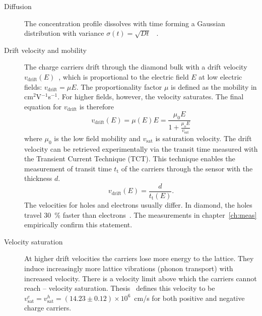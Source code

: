 \begin{description}

\item[Diffusion]
The concentration profile dissolves with time forming a Gaussian distribution with variance $\sigma(t)=\sqrt{Dt}$~\cite{} .

\item[Drift velocity and mobility]
The charge carriers drift through the diamond bulk with a drift velocity $v_\mathrm{drift}(E)$~\cite{}, which is proportional to the electric field $E$ at low electric fields: $v_\mathrm{drift} = \mu E$. The proportionality factor $\mu$ is defined as the mobility in cm$^2$V$^{-1}$s$^{-1}$. For higher fields, however, the velocity saturates. The final equation for $v_\mathrm{drift}$ is therefore
\begin{equation}
\label{eq:vsat}
v_\mathrm{drift}(E) = \mu(E)E= \frac{\mu_\mathrm{0} E}{1 + \frac{\mu_\mathrm{o} E}{v_\mathrm{sat}}}
\end{equation}
where $\mu_\mathrm{0}$ is the low field mobility and $v_\mathrm{sat}$ is saturation velocity. The drift velocity can be retrieved experimentally via the transit time measured with the Transient Current Technique (TCT). This technique enables the measurement of transit time $t_\mathrm{t}$ of the carriers through the sensor with the thickness $d$. 
\begin{equation}
\label{eq:vsat}
v_\mathrm{drift}(E) = \frac{d}{t_\mathrm{t}(E)}.
\end{equation}
The velocities for holes and electrons usually differ. In diamond, the holes travel 30~\% faster than electrons~\cite{}. The measurements in chapter~\ref{ch:meas} empirically confirm this statement.

\item[Velocity saturation] At higher drift velocities the carriers lose more energy to the lattice. They induce increasingly more lattice vibrations (phonon transport) with increased velocity. There is a velocity limit above which the carriers cannot reach -- velocity saturation. Thesis~\cite{} defines this velocity to be $v^e_\mathrm{sat}=v^h_\mathrm{sat}=(14.23\pm0.12)\times10^6$~cm/s for both positive and negative charge carriers.


\end{description}
